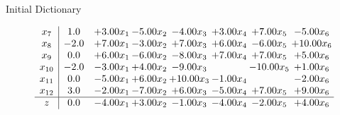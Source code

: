 \documentclass[8pt]{article}
\begin{document}
Initial Dictionary 

\[\begin{array}{c| c c@{\hskip 2pt} c@{\hskip 2pt} c@{\hskip 2pt} c@{\hskip 2pt} c@{\hskip 2pt} c@{\hskip 2pt} }
 x_{7}   &  1.0 & +  3.00 x_{1} & -5.00 x_{2} & -4.00 x_{3} & +  3.00 x_{4} & +  7.00 x_{5} & -5.00 x_{6}\\
 x_{8}   &  -2.0 & +  7.00 x_{1} & -3.00 x_{2} & +  7.00 x_{3} & +  6.00 x_{4} & -6.00 x_{5} & + 10.00 x_{6}\\
 x_{9}   &  0.0 & +  6.00 x_{1} & -6.00 x_{2} & -8.00 x_{3} & +  7.00 x_{4} & +  7.00 x_{5} & +  5.00 x_{6}\\
 x_{10}   &  -2.0 & -3.00 x_{1} & +  4.00 x_{2} & -9.00 x_{3} &   & -10.00 x_{5} & +  1.00 x_{6}\\
 x_{11}   &  0.0 & -5.00 x_{1} & +  6.00 x_{2} & + 10.00 x_{3} & -1.00 x_{4} &   & -2.00 x_{6}\\
 x_{12}   &  3.0 & -2.00 x_{1} & -7.00 x_{2} & +  6.00 x_{3} & -5.00 x_{4} & +  7.00 x_{5} & +  9.00 x_{6}\\
\hline
z    &  0.0 & -4.00 x_{1} & +  3.00 x_{2} & -1.00 x_{3} & -4.00 x_{4} & -2.00 x_{5} & +  4.00 x_{6}\\
\end{array}\]
\end{document}
